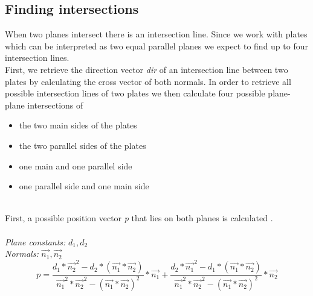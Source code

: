\documentclass[../ClassicThesis.tex]{subfiles}
\begin{document}
\subsection{Finding intersections}\label{findIntersections}
When two planes intersect there is an intersection line. Since we work with plates which can be interpreted as two equal parallel planes we expect to find up to four intersection lines.\\
First, we retrieve the direction vector \emph{dir} of an intersection line between two plates by calculating the cross vector of both normals. In order to retrieve all possible intersection lines of two plates we then calculate four possible plane-plane intersections of 
\begin{itemize}
\item the two main sides of the plates
\item the two parallel sides of the plates
\item one main and one parallel side 
\item one parallel side and one main side
\end{itemize}
\*\\
First, a possible position vector \emph{p} that lies on both planes is calculated \cite{positionVectorRetrieval}.
\\\*\\
\emph{Plane constants:} $d_1, d_2$\\
\emph{Normals:} $\vec{n_1}, \vec{n_2}$
$$ p = \frac{d_1 * \vec{n_{2}}^{2} - d_2 * (\vec{n_1} * \vec{n_2})}{\vec{n_{1}}^{2} * \vec{n_{2}}^{2} - (\vec{n_1} * \vec{n_2})^{2}} * \vec{n_1} + \frac{d_2*\vec{n_1}^2 - d_1*(\vec{n_1} * \vec{n_2})}{\vec{n_1}^2 * \vec{n_2}^2 - (\vec{n_1} * \vec{n_2})^2} * \vec{n_2} $$
\end{document}
